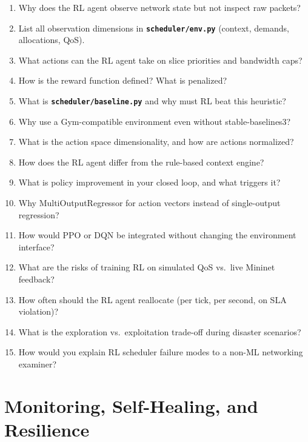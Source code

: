 \documentclass[11pt,a4paper]{article}
\newcommand{\proj}[1]{\textbf{\texttt{#1}}}
\begin{document}
\begin{enumerate}
    \item Why does the RL agent observe network state but not inspect raw packets?
    \item List all observation dimensions in \proj{scheduler/env.py} (context, demands, allocations, QoS).
    \item What actions can the RL agent take on slice priorities and bandwidth caps?
    \item How is the reward function defined? What is penalized?
    \item What is \proj{scheduler/baseline.py} and why must RL beat this heuristic?
    \item Why use a Gym-compatible environment even without stable-baselines3?
    \item What is the action space dimensionality, and how are actions normalized?
    \item How does the RL agent differ from the rule-based context engine?
    \item What is policy improvement in your closed loop, and what triggers it?
    \item Why MultiOutputRegressor for action vectors instead of single-output regression?
    \item How would PPO or DQN be integrated without changing the environment interface?
    \item What are the risks of training RL on simulated QoS vs.\ live Mininet feedback?
    \item How often should the RL agent reallocate (per tick, per second, on SLA violation)?
    \item What is the exploration vs.\ exploitation trade-off during disaster scenarios?
    \item How would you explain RL scheduler failure modes to a non-ML networking examiner?
\end{enumerate}

\section{Monitoring, Self-Healing, and Resilience}
\end{document}
